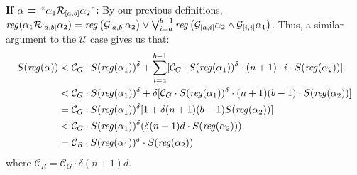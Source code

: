 \documentclass[runningheads]{llncs}
\begin{document}
  \textbf{If $\alpha$ = $``\alpha_1 \mathcal{R}_{[a, b]} \alpha_2"$:}
        By our previous definitions, $\text{\emph{reg}}(\alpha_1 \mathcal{R}_{[a,b]} \alpha_2) =  \text{\emph{reg}}\left(\mathcal{G}_{[a,b]}\alpha_2\right) \lor \bigvee_{i=a}^{b-1} \text{\emph{reg}}\left(\mathcal{G}_{[a,i]}\alpha_2 \land \mathcal{G}_{[i, i]} \alpha_1\right)$. Thus, a similar argument to the $\mathcal{U}$ case gives us that: 
        \begin{align*}
            S(\text{\emph{reg}}(\alpha)) &< 
            \mathcal{C}_G \cdot S(\text{\emph{reg}}(\alpha_1))^
            \delta + \sum_{i = a}^{b-1} [\mathcal{C}_G \cdot S(\text{\emph{reg}}(\alpha_1))^
            \delta \cdot (n+1)\cdot i \cdot S(\text{\emph{reg}}(\alpha_2))] \\
            &< \mathcal{C}_G \cdot S(\text{\emph{reg}}(\alpha_1))^
            \delta + \delta[\mathcal{C}_G \cdot S(\text{\emph{reg}}(\alpha_1))^
            \delta \cdot (n+1)(b-1) \cdot S(\text{\emph{reg}}(\alpha_2))] \\
            &= \mathcal{C}_G \cdot S(\text{\emph{reg}}(\alpha_1))^
            \delta [1 + \delta(n+1)(b-1)S(\text{\emph{reg}}(\alpha_2))] \\
            &< \mathcal{C}_G \cdot S(\text{\emph{reg}}(\alpha_1))^
            \delta (\delta(n+1)d \cdot S(\text{\emph{reg}}(\alpha_2))) \\
            &= \mathcal{C}_R \cdot S(\text{\emph{reg}}(\alpha_1))^\delta \cdot S(\text{\emph{reg}}(\alpha_2))
        \end{align*}
        where $\mathcal{C}_R = \mathcal{C}_G \cdot \delta (n+1)d$. \\
\end{document}
